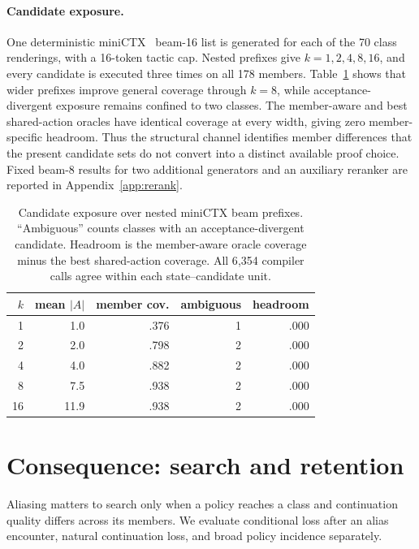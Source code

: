 \documentclass[11pt]{article}
\begin{document}
\paragraph{Candidate exposure.}
One deterministic miniCTX~\cite{hu2024minictx} beam-16 list is generated for
each of the 70 class renderings, with a 16-token tactic cap. Nested prefixes
give $k=1,2,4,8,16$, and every candidate is executed three times on all 178
members. Table~\ref{tab:width} shows that wider prefixes improve general
coverage through $k=8$, while acceptance-divergent exposure remains confined
to two classes. The member-aware and best shared-action oracles have identical
coverage at every width, giving zero member-specific headroom. Thus the
structural channel identifies member differences that the present candidate
sets do not convert into a distinct available proof choice. Fixed beam-8
results for two additional generators and an auxiliary reranker are reported
in Appendix~\ref{app:rerank}.

\begin{table}[t]\centering\small
\setlength{\tabcolsep}{3.5pt}
\begin{tabular}{@{}rrrrr@{}}
\toprule
$k$ & mean $|A|$ & member cov. & ambiguous & headroom \\
\midrule
1  & 1.0  & .376 & 1 & .000 \\
2  & 2.0  & .798 & 2 & .000 \\
4  & 4.0  & .882 & 2 & .000 \\
8  & 7.5  & .938 & 2 & .000 \\
16 & 11.9 & .938 & 2 & .000 \\
\bottomrule
\end{tabular}
\caption{Candidate exposure over nested miniCTX beam prefixes. ``Ambiguous''
counts classes with an acceptance-divergent candidate. Headroom is the
member-aware oracle coverage minus the best shared-action coverage. All
6{,}354 compiler calls agree within each state--candidate unit.}
\label{tab:width}
\end{table}

\section{Consequence: search and retention}
\label{sec:search}

Aliasing matters to search only when a policy reaches a class and continuation
quality differs across its members. We evaluate conditional loss after an alias
encounter, natural continuation loss, and broad policy incidence separately.
\end{document}
